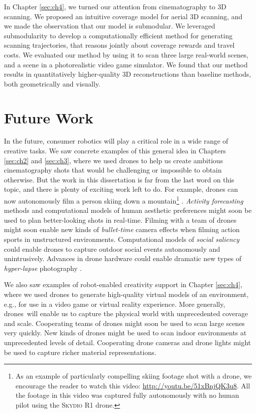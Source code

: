 In Chapter \ref{sec:ch4}, we turned our attention from cinematography to 3D scanning.
We proposed an intuitive coverage model for aerial 3D scanning, and we made the observation that our model is submodular.
We leveraged submodularity to develop a computationally efficient method for generating scanning trajectories, that reasons jointly about coverage rewards and travel costs.
We evaluated our method by using it to scan three large real-world scenes, and a scene in a photorealistic video game simulator.
We found that our method results in quantitatively higher-quality 3D reconstructions than baseline methods, both geometrically and visually.

\section{Future Work}

In the future, consumer robotics will play a critical role in a wide range of creative tasks. 
We saw concrete examples of this general idea in Chapters \ref{sec:ch2} and \ref{sec:ch3}, where we used drones to help us create ambitious cinematography shots that would be challenging or impossible to obtain otherwise.
But the work in this dissertation is far from the last word on this topic, and there is plenty of exciting work left to do.
For example, drones can now autonomously film a person skiing down a mountain\footnote{As an example of particularly compelling skiing footage shot with a drone, we encourage the reader to watch this video: \url{http://youtu.be/51xBnjQK3u8}. All the footage in this video was captured fully autonomously with no human pilot using the \textsc{Skydio R1} drone.} \cite{skydio:2018}.
\emph{Activity forecasting} methods \cite{kitani:2012} and computational models of human aesthetic preferences \cite{secord:2011} might soon be used to plan better-looking shots in real-time.
Filming with a team of drones \cite{nageli:2017} might soon enable new kinds of \emph{bullet-time} camera effects \cite{zitnick:2004} when filming action sports in unstructured environments. Computational models of \emph{social saliency} \cite{park:2012,arev:2014} could enable drones to capture outdoor social events autonomously and unintrusively.
Advances in drone hardware could enable dramatic new types of \emph{hyper-lapse} photography \cite{kopf:2014}.

We also saw examples of robot-enabled creativity support in Chapter \ref{sec:ch4}, where we used drones to generate high-quality virtual models of an environment, e.g., for use in a video game or virtual reality experience.
More generally, drones\ will enable us to capture the physical world with unprecedented coverage and scale.
Cooperating teams of drones might soon be used to scan large scenes very quickly.
New kinds of drones might be used to scan indoor environments at unprecedented levels of detail. Cooperating drone cameras and drone lights might be used to capture richer material representations.

